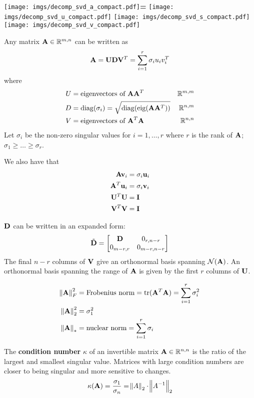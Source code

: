 \begin{center}
\texttt{[image: imgs/decomp\_svd\_a\_compact.pdf]}\textbf{\large =}
\texttt{[image: imgs/decomp\_svd\_u\_compact.pdf]}\textbf{\large *}
\texttt{[image: imgs/decomp\_svd\_s\_compact.pdf]}\textbf{\large *}
\texttt{[image: imgs/decomp\_svd\_v\_compact.pdf]}
\end{center}

Any matrix $\mathbf{A}\in\mathbb{R}^{m,n}$ can be written as
\begin{equation}
\mathbf{A}=\mathbf{U} \mathbf{D} \mathbf{V}^T=\sum_{i=1}^r \sigma_i u_i v_i^T
\end{equation}
where
\begin{align}
U&=\textrm{eigenvectors of~}\mathbf{A}\mathbf{A}^T & \mathbb{R}^{m,m} \\
D&=\operatorname{diag}(\sigma_i)=\sqrt{\operatorname{diag}(\operatorname{eig}(\mathbf{A}\mathbf{A}^T))}      & \mathbb{R}^{n,m} \\
V&=\textrm{eigenvectors of~}\mathbf{A}^T\mathbf{A} & \mathbb{R}^{n,n}
\end{align}
Let $\sigma_i$ be the non-zero singular values for $i=1,\ldots,r$ where $r$ is the rank of $\mathbf{A}$; $\sigma_1\ge\ldots\ge\sigma_r$.

We also have that
\begin{align}
\mathbf{A}   \mathbf{v}_i &= \sigma_i \mathbf{u}_i \\
\mathbf{A}^T \mathbf{u}_i &= \sigma_i \mathbf{v}_i \\
\mathbf{U}^T\mathbf{U} &= \mathbf{I} \\
\mathbf{V}^T\mathbf{V} &= \mathbf{I}
\end{align}

$\mathbf{D}$ can be written in an expanded form:
\begin{equation}
\tilde {\mathbf{D}}=
\begin{bmatrix}
\mathbf{D}       & 0_{r,n-r}   \\
0_{m-r,r} & 0_{m-r,n-r}
\end{bmatrix}
\end{equation}
The final $n-r$ columns of $\mathbf{V}$ give an orthonormal basis spanning $\mathcal{N}(\mathbf{A})$. An orthonormal basis spanning the range of $\mathbf{A}$ is given by the first $r$ columns of $\mathbf{U}$.

\begin{align}
\norm{\mathbf{A}}^2_F&=\textrm{Frobenius norm} =\operatorname{tr}(\mathbf{A}^T\mathbf{A})=\sum_{i=1}^r \sigma_i^2 \\
\norm{\mathbf{A}}^2_2&=\sigma_1^2 \\
\norm{\mathbf{A}}_* &= \textrm{nuclear norm}=\sum_{i=1}^r \sigma_i
\end{align}

The \textbf{condition number} $\kappa$ of an invertible matrix $\mathbf{A}\in\mathbb{R}^{n,n}$ is the ratio of the largest and smallest singular value. Matrices with large condition numbers are closer to being singular and more sensitive to changes.
\begin{equation}
\kappa(\mathbf{A})=\frac{\sigma_1}{\sigma_n}=\norm{A}_2 \cdot \norm{A^{-1}}_2
\end{equation}

